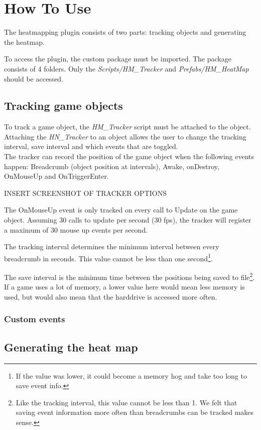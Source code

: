 \section{How To Use}
\label{HowToUse}
The heatmapping plugin consists of two parts: tracking objects and generating the heatmap.

To access the plugin, the custom package must be imported. The package consists of 4 folders. Only the \textit{Scripts/HM\_Tracker} and \textit{Prefabs/HM\_HeatMap} should be accessed.

\subsection{Tracking game objects}
\label{HowToUse_Tracking}
To track a game object, the \textit{HM\_Tracker} script must be attached to the object. Attaching the \textit{HN\_Tracker} to an object allows the user to change the tracking interval, save interval and which events that are toggled.
\\The tracker can record the position of the game object when the following events happen: Breadcrumb (object position at intervals), Awake, onDestroy, OnMouseUp and OnTriggerEnter.

INSERT SCREENSHOT OF TRACKER OPTIONS

The OnMouseUp event is only tracked on every call to Update on the game object. Assuming 30 calls to update per second (30 fps), the tracker will register a maximum of 30 mouse up events per second.

The tracking interval determines the minimum interval between every breadcrumb in seconds. This value cannot be less than one second\footnote{If the value was lower, it could become a memory hog and take too long to save event info.}.

The save interval is the minimum time between the positions being saved to file\footnote{Like the tracking interval, this value cannot be less than 1. We felt that saving event information more often than breadcrumbs can be tracked makes sense.}. 
If a game uses a lot of memory, a lower value here would mean less memory is used, but would also mean that the harddrive is accessed more often.

\subsubsection{Custom events}

\subsection{Generating the heat map}
\label{HowToUse_Generating}
